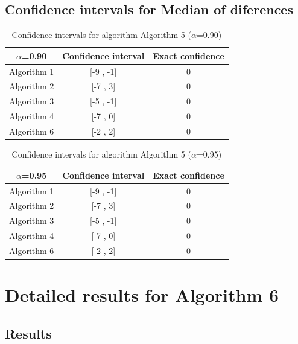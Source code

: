 \documentclass[a4paper,10pt]{article}
\begin{document}
\subsection{Confidence intervals for Median of diferences}

\begin{table}[!htp]
\centering\small
\begin{tabular}{
|c|c|c|}
\hline
 $\alpha$=0.90 & Confidence interval & Exact confidence \\ \hline 
Algorithm 1 & [-9 , -1] & 0\\ \hline 
Algorithm 2 & [-7 , 3] & 0\\ \hline 
Algorithm 3 & [-5 , -1] & 0\\ \hline 
Algorithm 4 & [-7 , 0] & 0\\ \hline 
Algorithm 6 & [-2 , 2] & 0\\ \hline 

\end{tabular}
\caption{Confidence intervals for algorithm Algorithm 5 ($\alpha$=0.90)}
\end{table}
\begin{table}[!htp]
\centering\small
\begin{tabular}{
|c|c|c|}
\hline
 $\alpha$=0.95 & Confidence interval & Exact confidence \\ \hline 
Algorithm 1 & [-9 , -1] & 0\\ \hline 
Algorithm 2 & [-7 , 3] & 0\\ \hline 
Algorithm 3 & [-5 , -1] & 0\\ \hline 
Algorithm 4 & [-7 , 0] & 0\\ \hline 
Algorithm 6 & [-2 , 2] & 0\\ \hline 

\end{tabular}
\caption{Confidence intervals for algorithm Algorithm 5 ($\alpha$=0.95)}
\end{table}

 \clearpage 


\section{Detailed results for Algorithm 6}


\subsection{Results}
\end{document}
